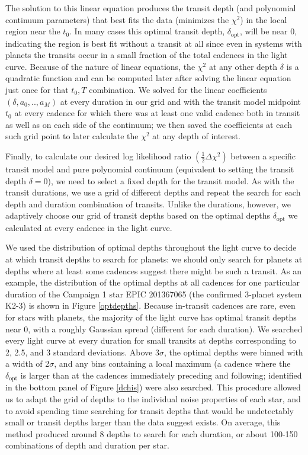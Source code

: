 \documentclass[twocolumn]{aastex62}
\begin{document}
The solution to this linear equation produces the transit depth (and
polynomial continuum parameters) that best fits the data (minimizes
the $\chi^2$) in the local region near the $t_0$. In many cases this
optimal transit depth, $\delta_{\text{opt}}$, will be near 0,
indicating the region is best fit without a transit at all since even
in systems with planets the transits occur in a small fraction of the
total cadences in the light curve.  Because of the nature of linear
equations, the $\chi^2$ at any other depth $\delta$ is a quadratic
function and can be computed later after solving the linear equation
just once for that $t_0, T$ combination.  We solved for the linear
coefficients $(\delta,a_0,..,a_M)$ at every duration in our grid and
with the transit model midpoint $t_0$ at every cadence for which there
was at least one valid cadence both in transit as well as on each side
of the continuum; we then saved the coefficients at each such grid
point to later calculate the $\chi^2$ at any depth of interest.

Finally, to calculate our desired log likelihood ratio
$\left(\frac{1}{2}\Delta \chi^2\right)$ between a specific transit
model and pure polynomial continuum (equivalent to setting the transit
depth $\delta = 0$), we need to select a fixed depth for the transit
model. As with the transit durations, we use a grid of different
depths and repeat the search for each depth and duration combination
of transits. Unlike the durations, however, we adaptively choose our
grid of transit depths based on the optimal depths
$\delta_{\text{opt}}$ we calculated at every cadence in the light
curve.

We used the distribution of optimal depths throughout the light curve
to decide at which transit depths to search for planets: we should
only search for planets at depths where at least some cadences suggest
there might be such a transit. As an example, the distribution of the
optimal depths at all cadences for one particular duration of the
Campaign 1 star EPIC 201367065 (the confirmed 3-planet system K2-3) is
shown in Figure \ref{optdepths}. Because in-transit cadences are rare,
even for stars with planets, the majority of the light curve has
optimal transit depths near 0, with a roughly Gaussian spread
(different for each duration). We searched every light curve at every
duration for small transits at depths corresponding to 2, 2.5, and 3
standard deviations. Above 3$\sigma$, the optimal depths were binned
with a width of 2$\sigma$, and any bins containing a local maximum (a
cadence where the $\delta_{\text{opt}}$ is larger than at the cadences
immediately preceding and following; identified in the bottom panel of
Figure \ref{dchis}) were also searched.  This procedure allowed us to
adapt the grid of depths to the individual noise properties of each
star, and to avoid spending time searching for transit depths that
would be undetectably small or transit depths larger than the data
suggest exists. On average, this method produced around 8 depths to
search for each duration, or about 100-150 combinations of depth and
duration per star.
\end{document}
